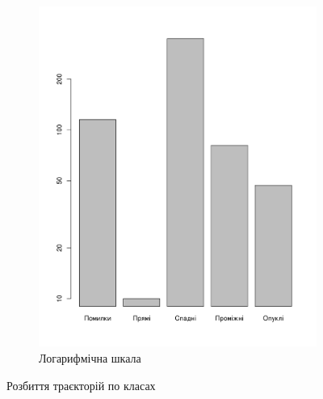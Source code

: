 \begin{figure}[h]
\begin{subfigure}[b]{0.45\textwidth}
    \includegraphics[width=\textwidth]{images/poisson_types_log}
    \caption{Логарифмічна шкала}
    \label{fig:tapping:poisson:types:log}
  \end{subfigure}
  \caption{Розбиття траєкторій по класах}
\end{figure}

